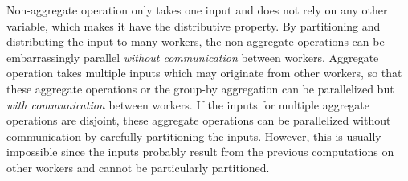 

Non-aggregate operation only takes one input and does not rely on any other variable, which makes it have the distributive property. By partitioning and distributing the input to many workers, the non-aggregate operations can be embarrassingly parallel \emph{without communication} between workers. Aggregate operation takes multiple inputs which may originate from other workers, so that these aggregate operations or the group-by aggregation can be parallelized but \emph{with communication} between workers. If the inputs for multiple aggregate operations are disjoint, these aggregate operations can be parallelized without communication by carefully partitioning the inputs. However, this is usually impossible since the inputs probably result from the previous computations on other workers and cannot be particularly partitioned.





